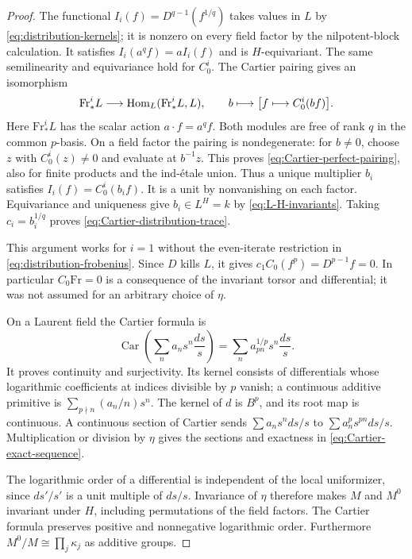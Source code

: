 \begin{proof}
The functional $I_i(f)=D^{q-1}(f^{1/q})$ takes values in $L$ by
\eqref{eq:distribution-kernels}; it is nonzero on every field factor
by the nilpotent-block calculation.  It satisfies
$I_i(a^qf)=aI_i(f)$ and is $H$-equivariant.  The same semilinearity
and equivariance hold for $C_0^i$.  The Cartier pairing gives an
isomorphism
\begin{equation}
 \label{eq:Cartier-perfect-pairing}
 \mathrm{Fr}_*^iL\longrightarrow
 \operatorname{Hom}_L(\mathrm{Fr}_*^iL,L),\qquad
 b\longmapsto\bigl[f\longmapsto C_0^i(bf)\bigr].
\end{equation}
Here $\mathrm{Fr}_*^iL$ has the scalar action $a\cdot f=a^qf$.
Both modules are free of rank $q$ in the common $p$-basis.  On a
field factor the pairing is nondegenerate: for $b\ne0$, choose $z$
with $C_0^i(z)\ne0$ and evaluate at $b^{-1}z$.  This proves
\eqref{eq:Cartier-perfect-pairing}, also for finite products and the
ind-\'{e}tale union.  Thus a unique multiplier $b_i$ satisfies
$I_i(f)=C_0^i(b_if)$.  It is a unit by nonvanishing on each factor.
Equivariance and uniqueness give $b_i\in L^H=k$ by
\eqref{eq:L-H-invariants}.  Taking $c_i=b_i^{1/q}$ proves
\eqref{eq:Cartier-distribution-trace}.

This argument works for $i=1$ without the even-iterate restriction
in \eqref{eq:distribution-frobenius}.  Since $D$ kills $L$, it gives
$c_1C_0(f^p)=D^{p-1}f=0$.  In particular $C_0\mathrm{Fr}=0$ is a
consequence of the invariant torsor and differential; it was not
assumed for an arbitrary choice of $\eta$.

On a Laurent field the Cartier formula is
\[
 \operatorname{Car}\left(\sum_n a_ns^n\frac{ds}{s}\right)
 =\sum_n a_{pn}^{1/p}s^n\frac{ds}{s}.
\]
It proves continuity and surjectivity.  Its kernel consists of
differentials whose logarithmic coefficients at indices divisible
by $p$ vanish; a continuous additive primitive is
$\sum_{p\nmid n}(a_n/n)s^n$.  The kernel of $d$ is $B^p$, and its
root map is continuous.  A continuous section of Cartier sends
$\sum a_ns^n ds/s$ to $\sum a_n^ps^{pn}ds/s$.
Multiplication or division by $\eta$ gives the sections and
exactness in \eqref{eq:Cartier-exact-sequence}.

The logarithmic order of a differential is independent of the local
uniformizer, since $ds'/s'$ is a unit multiple of $ds/s$.
Invariance of $\eta$ therefore makes $M$ and $M^0$ invariant under
$H$, including permutations of the field factors.  The Cartier
formula preserves positive and nonnegative logarithmic order.
Furthermore $M^0/M\cong\prod_j\kappa_j$ as additive groups.


\end{proof}
